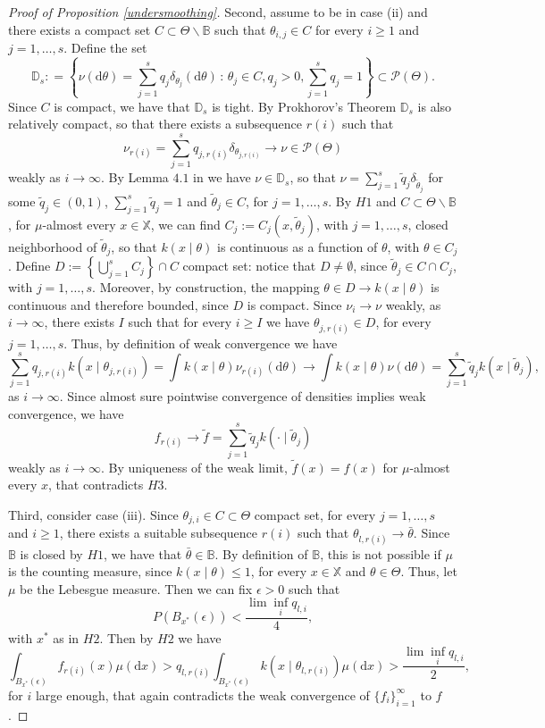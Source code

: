 \documentclass[12pt]{article}
\def \d {\mathrm{d}}
\begin{document}
\begin{proof}[Proof of Proposition \ref{undersmoothing}]
Second, assume to be in case (ii) and there exists a compact set $C \subset \Theta \backslash \mathbb{B}$ such that $\theta_{i,j} \in C$ for every $i \geq 1$ and $j = 1, \dots, s$. Define the set
\[
\mathbb{D}_s : = \left\{\nu(\d \theta) = \sum_{j = 1}^sq_j\delta_{\theta_j}(\d \theta) \, : \, \theta_j \in C, q_j > 0, \sum_{j = 1}^sq_j = 1  \right\} \subset \mathcal{P}(\Theta).
\]
Since $C$ is compact, we have that $\mathbb{D}_s$ is tight. By Prokhorov's Theorem $\mathbb{D}_s$ is also relatively compact, so that there exists a subsequence $r(i)$ such that 
\[
\nu_{r(i)} = \sum_{j = 1}^sq_{j,r(i)}\delta_{\theta_{j,r(i)}} \to \nu \in \mathcal{P}(\Theta)
\]
weakly as $i \to \infty$. By Lemma $4.1$ in \cite{Cai2020} we have $\nu \in \mathbb{D}_{s}$, so that $\nu = \sum_{j = 1}^s\tilde{q}_j\delta_{\tilde{\theta}_j}$ for some $\tilde{q}_j \in (0,1)$, $\sum_{j = 1}^s\tilde{q}_j = 1$ and $\tilde{\theta}_j \in C$, for $j = 1, \dots, s$. By $H1$ and $C \subset \Theta \backslash \mathbb{B}$, for $\mu$-almost every $x \in \mathbb{X}$, we can find $C_j := C_j(x, \tilde{\theta}_j)$, with $j = 1, \dots, s$, closed neighborhood of $\tilde{\theta}_j$, so that $k(x \mid \theta)$ is continuous as a function of $\theta$, with $\theta \in C_j$. Define $D := \left\{\bigcup_{j = 1}^s C_j\right\}\cap C$ compact set: notice that $D \neq \emptyset$, since $\tilde{\theta}_j \in C \cap C_j$, with $j = 1, \dots, s$. Moreover, by construction, the mapping $\theta \in D \to k(x \mid \theta)$ is continuous and therefore bounded, since $D$ is compact. Since $\nu_i \to \nu$ weakly, as $i \to \infty$, there exists $I$ such that for every $i \geq I$ we have $\theta_{j, r(i)} \in D$, for every $j = 1, \dots, s$. Thus, by definition of weak convergence we have
\[
\sum_{j = 1}^sq_{j,r(i)}k(x \mid \theta_{j, r(i)}) = \int k(x \mid \theta) \nu_{r(i)}(\d \theta) \to \int k(x \mid \theta) \nu(\d \theta) = \sum_{j = 1}^s\tilde{q}_{j}k(x \mid \tilde{\theta}_{j}),
\]
as $i \to \infty$. Since almost sure pointwise convergence of densities implies weak convergence, we have
\[
f_{r(i)} \to \tilde{f} = \sum_{j = 1}^s\tilde{q}_{j}k(\cdot \mid \tilde{\theta}_{j})
\]
weakly as $i \to \infty$. By uniqueness of the weak limit, $\tilde{f}(x) = f(x)$ for $\mu$-almost every $x$, that contradicts $H3$.

Third, consider case (iii). Since $\theta_{j, i} \in C \subset \Theta$ compact set, for every $j = 1, \dots, s$ and $i \geq 1$, there exists a suitable subsequence $r(i)$ such that $\theta_{l, r(i)} \to \bar{\theta}$. Since $\mathbb{B}$ is closed by $H1$, we have that $\bar{\theta} \in \mathbb{B}$. By definition of $\mathbb{B}$, this is not possible if $\mu$ is the counting measure, since $k(x \mid \theta) \leq 1$, for every $x \in \mathbb{X}$ and $\theta \in \Theta$. Thus, let $\mu$ be the Lebesgue measure. Then we can fix $\epsilon > 0$ such that
\[
P(B_{x^*}(\epsilon)) < \frac{\lim \inf_i q_{l,i}}{4},
\]
with $x^*$ as in $H2$. Then by $H2$ we have
\[
\int_{B_{x^*}(\epsilon)}f_{r(i)}(x) \mu(\d x) > q_{l,r(i)}\int_{B_{x^*}(\epsilon)}k(x \mid \theta_{l,r(i)}) \mu(\d x) > \frac{\lim \inf_i q_{l,i}}{2},
\]
for $i $ large enough, that again contradicts the weak convergence of $\{f_i\}_{i = 1}^\infty$ to $f$.
\end{proof}
\end{document}
